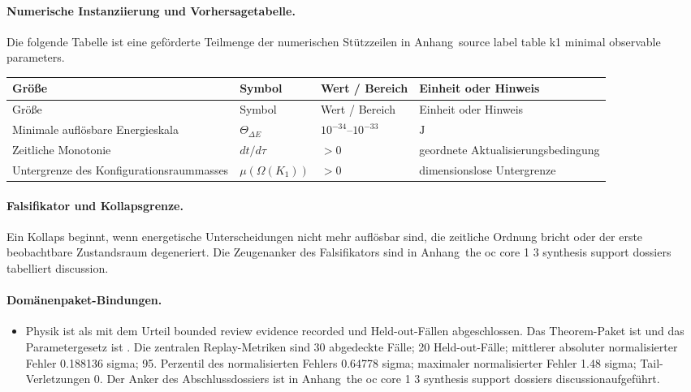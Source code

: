 \paragraph{Numerische Instanziierung und Vorhersagetabelle.}
Die folgende Tabelle ist eine geförderte Teilmenge der numerischen Stützzeilen in Anhang~source label table k1 minimal observable parameters.
\begin{longtable}{@{}L{0.27\textwidth}L{0.15\textwidth}L{0.24\textwidth}L{0.16\textwidth}@{}}
\toprule
Größe & Symbol & Wert / Bereich & Einheit oder Hinweis \\
\midrule
\endfirsthead
\toprule
Größe & Symbol & Wert / Bereich & Einheit oder Hinweis \\
\midrule
\endhead
Minimale auflösbare Energieskala & $\scriptstyle \Theta_{\Delta E}$ & $10^{-34}\text{--}10^{-33}$ & $\mathrm{J}$ \\
Zeitliche Monotonie & $\scriptstyle dt/\allowbreak d\tau$ & $> 0$ & geordnete Aktualisierungsbedingung \\
Untergrenze des Konfigurationsraummasses & $\scriptstyle \mu(\Omega(K_1))$ & $> 0$ & dimensionslose Untergrenze \\
\bottomrule
\end{longtable}

\paragraph{Falsifikator und Kollapsgrenze.}
Ein Kollaps beginnt, wenn energetische Unterscheidungen nicht mehr auflösbar sind, die zeitliche Ordnung bricht oder der erste beobachtbare Zustandsraum degeneriert.
Die Zeugenanker des Falsifikators sind in Anhang~the oc core 1 3 synthesis support dossiers tabelliert discussion.

\paragraph{Domänenpaket-Bindungen.}
\begin{itemize}[leftmargin=1.6em,nosep]
\item Physik ist als  mit dem Urteil bounded review evidence recorded und  Held-out-Fällen abgeschlossen. Das Theorem-Paket ist  und das Parametergesetz ist . Die zentralen Replay-Metriken sind 30 abgedeckte Fälle; 20 Held-out-Fälle; mittlerer absoluter normalisierter Fehler 0.188136 sigma; 95. Perzentil des normalisierten Fehlers 0.64778 sigma; maximaler normalisierter Fehler 1.48 sigma; Tail-Verletzungen 0. Der Anker des Abschlussdossiers ist in Anhang~the oc core 1 3 synthesis support dossiers discussionaufgeführt.
\end{itemize}

